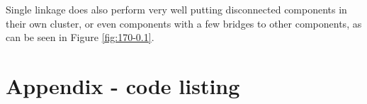 \documentclass[12pt,a4paper]{article}
\begin{document}
Single linkage does also perform very well putting disconnected
components in their own cluster, or even components with a few bridges
to other components, as can be seen in Figure \ref{fig:170-0.1}.



\nocite{*}

\appendix
\section{Appendix - code listing}

\inputminted[label=main.py]{python}{../src/main.py}
\hfill
\inputminted[label=measures.py]{python}{../src/measures.py}
\hfill
\inputminted[label=clink.py]{python}{../src/link.py}
\end{document}

